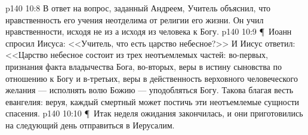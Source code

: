 \vs p140 10:8 В ответ на вопрос, заданный Андреем, Учитель объяснил, что нравственность его учения неотделима от религии его жизни. Он учил нравственности, исходя не из  а исходя из  человека к Богу.
\vs p140 10:9 \P\ Иоанн спросил Иисуса: <<Учитель, что есть царство небесное?>> И Иисус ответил: <<Царство небесное состоит из трех неотъемлемых частей: во\hyp{}первых, признания факта владычества Бога, во\hyp{}вторых, веры в истину сыновства по отношению к Богу и в\hyp{}третьих, веры в действенность верховного человеческого желания --- исполнять волю Божию --- уподобляться Богу. Такова благая весть евангелия: веруя, каждый смертный может постичь эти неотъемлемые сущности спасения.
\vs p140 10:10 \P\ Итак неделя ожидания закончилась, и они приготовились на следующий день отправиться в Иерусалим.

